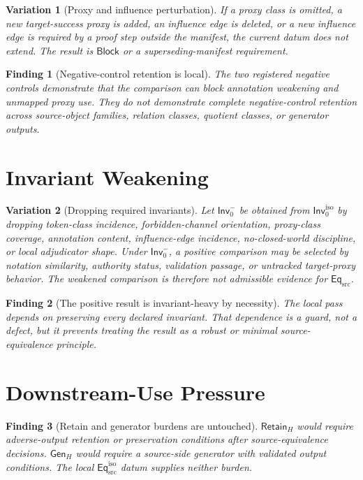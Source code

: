 \documentclass[11pt]{article}
\newcommand{\Inv}{\mathsf{Inv}_{0}^{\mathrm{iso}}}
\newcommand{\InvWeak}{\mathsf{Inv}_{0}^{-}}
\newcommand{\EqSrc}{\mathsf{Eq}_{\mathrm{src}}}
\newcommand{\EqIso}{\mathsf{Eq}_{\mathrm{src}}^{\mathrm{iso}}}
\newcommand{\GenH}{\mathsf{Gen}_{H}}
\newcommand{\RetainH}{\mathsf{Retain}_{H}}
\newcommand{\Block}{\mathsf{Block}}
\newtheorem{finding}{Finding}
\newtheorem{variant}{Variation}
\begin{document}
\begin{variant}[Proxy and influence perturbation]
If a proxy class is omitted, a new target-success proxy is added, an
influence edge is deleted, or a new influence edge is required by a proof
step outside the manifest, the current datum does not extend. The result
is \(\Block\) or a superseding-manifest requirement.
\end{variant}

\begin{finding}[Negative-control retention is local]
The two registered negative controls demonstrate that the comparison can
block annotation weakening and unmapped proxy use. They do not demonstrate
complete negative-control retention across source-object families,
relation classes, quotient classes, or generator outputs.
\end{finding}

\section{Invariant Weakening}

\begin{variant}[Dropping required invariants]
Let \(\InvWeak\) be obtained from \(\Inv\) by dropping token-class
incidence, forbidden-channel orientation, proxy-class coverage,
annotation content, influence-edge incidence, no-closed-world discipline,
or local adjudicator shape. Under \(\InvWeak\), a positive comparison may
be selected by notation similarity, authority status, validation passage,
or untracked target-proxy behavior. The weakened comparison is therefore
not admissible evidence for \(\EqSrc\).
\end{variant}

\begin{finding}[The positive result is invariant-heavy by necessity]
The local pass depends on preserving every declared invariant. That
dependence is a guard, not a defect, but it prevents treating the result as
a robust or minimal source-equivalence principle.
\end{finding}

\section{Downstream-Use Pressure}

\begin{finding}[Retain and generator burdens are untouched]
\(\RetainH\) would require adverse-output retention or preservation
conditions after source-equivalence decisions. \(\GenH\) would require a
source-side generator with validated output conditions. The local
\(\EqIso\) datum supplies neither burden.
\end{finding}
\end{document}
